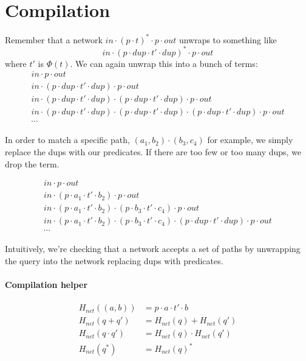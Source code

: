 \documentclass[12pt]{article}
\begin{document}
\section{Compilation}
Remember that a network $in \cdot (p \cdot t)^* \cdot p \cdot out$ unwraps to
something like
\[
  in \cdot (p \cdot dup \cdot t' \cdot dup)^* \cdot p \cdot out
\]
where $t'$ is $\Phi(t)$. We can again unwrap this into a bunch of terms:
\begin{gather*}
  in \cdot p \cdot out \\
  in \cdot
  (p \cdot dup \cdot t' \cdot dup)
  \cdot p \cdot out \\
  in \cdot
  (p \cdot dup \cdot t' \cdot dup) \cdot
  (p \cdot dup \cdot t' \cdot dup)
  \cdot p \cdot out \\
  in \cdot
  (p \cdot dup \cdot t' \cdot dup) \cdot
  (p \cdot dup \cdot t' \cdot dup) \cdot
  (p \cdot dup \cdot t' \cdot dup)
  \cdot p \cdot out \\
  \cdots
\end{gather*}

In order to match a specific path, $(a_1, b_2) \cdot (b_3, c_4)$ for example,
we simply replace the dups with our predicates. If there are too few or too
many dups, we drop the term.

\begin{gather*}
  in \cdot p \cdot out \tag{too few dups} \\
  in \cdot
  (p \cdot a_1 \cdot t' \cdot b_2)
  \cdot p \cdot out \tag{too few dups} \\
  in \cdot
  (p \cdot a_1 \cdot t' \cdot b_2) \cdot
  (p \cdot b_3 \cdot t' \cdot c_4)
  \cdot p \cdot out \tag{good!} \\
  in \cdot
  (p \cdot a_1 \cdot t' \cdot b_2) \cdot
  (p \cdot b_3 \cdot t' \cdot c_4) \cdot
  (p \cdot dup \cdot t' \cdot dup)
  \cdot p \cdot out \tag{too many dups} \\
  \cdots
\end{gather*}

Intuitively, we're checking that a network accepts a set of paths by unwrapping
the query into the network replacing dups with predicates.

\paragraph{Compilation helper}
\begin{align*}
  H_{net}((a, b))     &= p \cdot a \cdot t' \cdot b \\
  H_{net}(q + q')     &= H_{net}(q) + H_{net}(q') \\
  H_{net}(q \cdot q') &= H_{net}(q) \cdot H_{net}(q') \\
  H_{net}(q^*)        &= H_{net}(q)^*
\end{align*}
\end{document}
